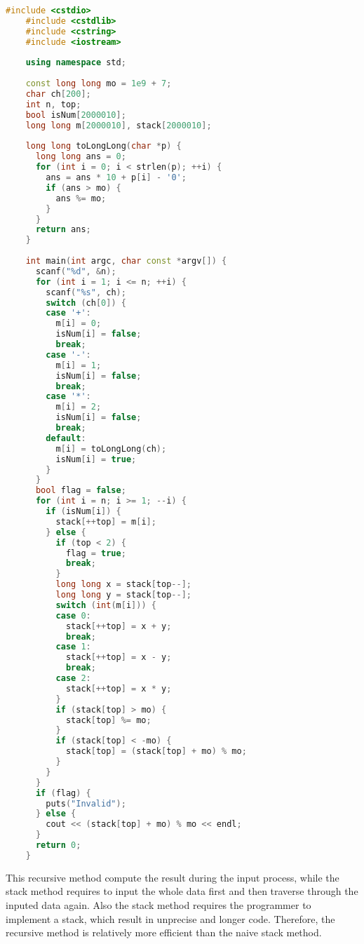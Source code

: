 \documentclass{report}
\begin{document}
\begin{lstlisting}[language=C++, caption={Problem 2 bad solution}]
    #include <cstdio>
    #include <cstdlib>
    #include <cstring>
    #include <iostream>
    
    using namespace std;
    
    const long long mo = 1e9 + 7;
    char ch[200];
    int n, top;
    bool isNum[2000010];
    long long m[2000010], stack[2000010];
    
    long long toLongLong(char *p) {
      long long ans = 0;
      for (int i = 0; i < strlen(p); ++i) {
        ans = ans * 10 + p[i] - '0';
        if (ans > mo) {
          ans %= mo;
        }
      }
      return ans;
    }
    
    int main(int argc, char const *argv[]) {
      scanf("%d", &n);
      for (int i = 1; i <= n; ++i) {
        scanf("%s", ch);
        switch (ch[0]) {
        case '+':
          m[i] = 0;
          isNum[i] = false;
          break;
        case '-':
          m[i] = 1;
          isNum[i] = false;
          break;
        case '*':
          m[i] = 2;
          isNum[i] = false;
          break;
        default:
          m[i] = toLongLong(ch);
          isNum[i] = true;
        }
      }
      bool flag = false;
      for (int i = n; i >= 1; --i) {
        if (isNum[i]) {
          stack[++top] = m[i];
        } else {
          if (top < 2) {
            flag = true;
            break;
          }
          long long x = stack[top--];
          long long y = stack[top--];
          switch (int(m[i])) {
          case 0:
            stack[++top] = x + y;
            break;
          case 1:
            stack[++top] = x - y;
            break;
          case 2:
            stack[++top] = x * y;
          }
          if (stack[top] > mo) {
            stack[top] %= mo;
          }
          if (stack[top] < -mo) {
            stack[top] = (stack[top] + mo) % mo;
          }
        }
      }
      if (flag) {
        puts("Invalid");
      } else {
        cout << (stack[top] + mo) % mo << endl;
      }
      return 0;
    }    
\end{lstlisting}

This recursive method compute the result during the input process,
while the stack method requires to input the whole data first and then
traverse through the inputed data again.
Also the stack method requires the programmer to implement a stack,
which result in unprecise and longer code.
Therefore, the recursive method is
relatively more efficient than the naive stack method.
\end{document}
